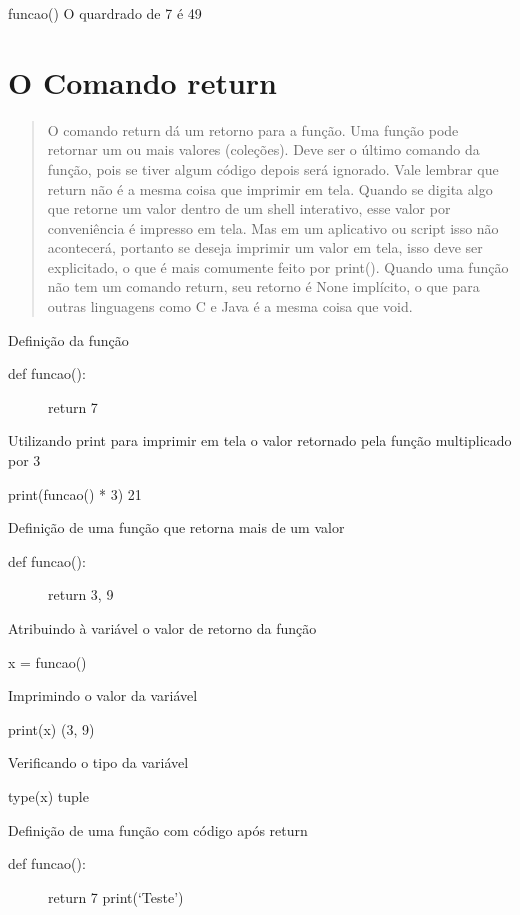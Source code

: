 \documentclass[letterpaper,10pt,brazil]{sphinxmanual}
\begin{document}
funcao()
O quardrado de 7 é 49


\section{O Comando return}
\label{\detokenize{content/functions:o-comando-return}}\begin{quote}

O comando return dá um retorno para a função.
Uma função pode retornar um ou mais valores (coleções).
Deve ser o último comando da função, pois se tiver algum código depois será ignorado.
Vale lembrar que return não é a mesma coisa que imprimir em tela. Quando se digita algo que retorne um valor dentro de um shell interativo, esse valor por conveniência é impresso em tela.
Mas em um aplicativo ou script isso não acontecerá, portanto se deseja imprimir um valor em tela, isso deve ser explicitado, o que é mais comumente feito por print().
Quando uma função não tem um comando return, seu retorno é None implícito, o que para outras linguagens como C e Java é a mesma coisa que void.
\end{quote}

Definição da função
\begin{description}
\item[{def funcao():}] \leavevmode
return 7

\end{description}

Utilizando print para imprimir em tela o valor retornado pela função multiplicado por 3

print(funcao() * 3)
21

Definição de uma função que retorna mais de um valor
\begin{description}
\item[{def funcao():}] \leavevmode
return 3, 9

\end{description}

Atribuindo à variável o valor de retorno da função

x = funcao()

Imprimindo o valor da variável

print(x)
(3, 9)

Verificando o tipo da variável

type(x)
tuple

Definição de uma função com código após return
\begin{description}
\item[{def funcao():}] \leavevmode
return 7
print(‘Teste’)

\end{description}
\end{document}
